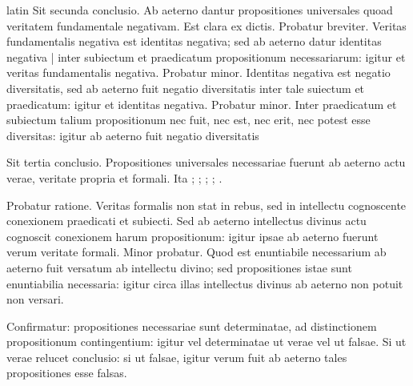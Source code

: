 \begin{otherlanguage*}{latin}
\pstart
  Sit secunda conclusio. Ab aeterno dantur propositiones universales quoad veritatem fundamentale negativam. Est clara ex dictis. Probatur breviter. Veritas fundamentalis negativa est identitas negativa; sed ab aeterno datur identitas negativa \textnormal{|} inter subiectum et praedicatum propositionum necessariarum: igitur et veritas fundamentalis negativa. Probatur minor. Identitas negativa est negatio diversitatis, sed ab aeterno fuit negatio diversitatis inter tale suiectum et praedicatum: igitur et identitas negativa. Probatur minor. Inter praedicatum et subiectum talium propositionum nec fuit, nec est, nec erit, nec potest esse diversitas: igitur ab aeterno fuit negatio diversitatis 
\pend

\pstart
  Sit tertia conclusio. Propositiones universales necessariae fuerunt ab aeterno actu verae, veritate propria et formali. Ita ;  ; ; ; . 
\pend

\pstart
  Probatur ratione. Veritas formalis non stat in rebus, sed in intellectu cognoscente conexionem praedicati et subiecti. Sed ab aeterno intellectus divinus actu cognoscit conexionem harum propositionum: igitur ipsae ab aeterno fuerunt verum veritate formali. Minor probatur. Quod est enuntiabile necessarium ab aeterno fuit versatum ab intellectu divino; sed propositiones istae sunt enuntiabilia necessaria: igitur circa illas intellectus divinus ab aeterno non potuit non versari. 
\pend

\pstart
  Confirmatur: propositiones necessariae sunt determinatae, ad distinctionem propositionum contingentium: igitur vel determinatae ut verae vel ut falsae. Si ut verae relucet conclusio: si ut falsae, igitur verum fuit ab aeterno tales propositiones esse falsas. 
\pend


\end{otherlanguage*}
